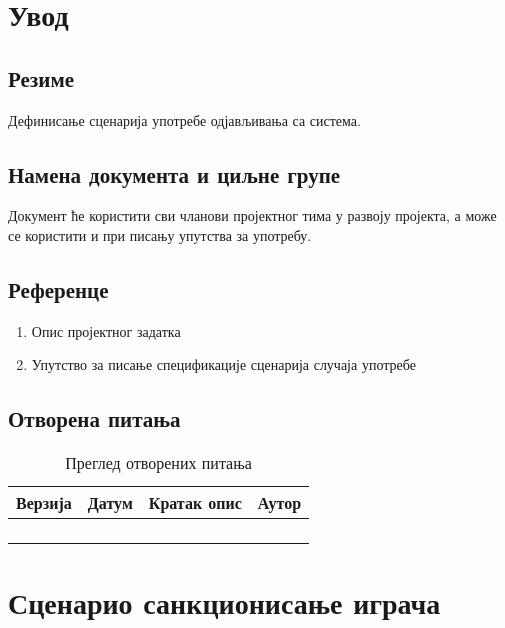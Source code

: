 \section{Увод}

\subsection{Резиме}
Дефинисање сценарија употребе одјављивања са система.

\subsection{Намена документа и циљне групе}
Документ ће користити сви чланови пројектног тима у развоју пројекта, а може се 
користити и при писању упутства за употребу.

\subsection{Референце}
\begin{enumerate}
	\item Опис пројектног задатка
	\item Упутство за писање спецификације сценарија случаја употребе
\end{enumerate}

\subsection{Отворена питања}
\begin{table}[h!]
\centering
	
	\begin{tabu}{ || X[l] | X[l] | X[l] | X[l] || }
	\hline
	\textbf{Верзија} & \textbf{Датум} & \textbf{Кратак опис} & \textbf{Аутор} \\
	\hline
	\hline
	& & &\\
	\hline
	& & &\\
	\hline
	& & &\\
	\hline
	& & &\\
	\hline
	\end{tabu}
	\caption{Преглед отворених питања}
	\label{table:2}
		
\end{table}



\section{Сценарио санкционисање играча}

